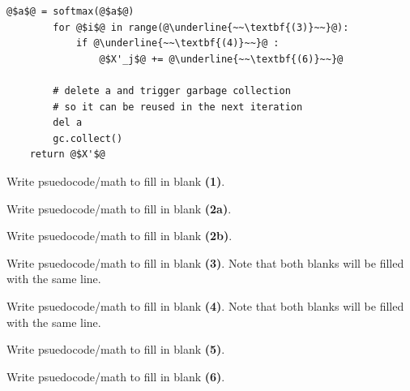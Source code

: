 \documentclass[11pt,addpoints,answers]{exam}
\begin{document}
\begin{questions}
\begin{parts}
\begin{lstlisting}[escapechar=@]
        @$a$@ = softmax(@$a$@)
        for @$i$@ in range(@\underline{~~\textbf{(3)}~~}@):
            if @\underline{~~\textbf{(4)}~~}@ :
                @$X'_j$@ += @\underline{~~\textbf{(6)}~~}@ 

        # delete a and trigger garbage collection 
        # so it can be reused in the next iteration
        del a
        gc.collect()
    return @$X'$@
    \end{lstlisting}
    
    \begin{subparts}

    \subpart[1] Write psuedocode/math to fill in blank \textbf{(1)}. 

    \begin{answer_box}[title=, height = 2cm, width=15cm]
    \end{answer_box}
    
    \subpart[1] Write psuedocode/math to fill in blank \textbf{(2a)}. 

    \begin{answer_box}[title=, height = 2cm, width=15cm]
    \end{answer_box}

    \subpart[1] Write psuedocode/math to fill in blank \textbf{(2b)}. 

    \begin{answer_box}[title=, height = 2cm, width=15cm]
    \end{answer_box}


    \subpart[1] Write psuedocode/math to fill in blank \textbf{(3)}. Note that both blanks will be filled with the same line. 
    
    \begin{answer_box}[title=, height = 2cm, width=15cm]
    \end{answer_box}

    
    \subpart[1] Write psuedocode/math to fill in blank \textbf{(4)}. Note that both blanks will be filled with the same line. 
    
    \begin{answer_box}[title=, height = 2cm, width=15cm]
    \end{answer_box}

    \subpart[1] Write psuedocode/math to fill in blank \textbf{(5)}.

    \begin{answer_box}[title=, height = 2cm, width=15cm]
    \end{answer_box}

    \subpart[1] Write psuedocode/math to fill in blank \textbf{(6)}. 


\end{subparts}
\end{parts}
\end{questions}
\end{document}
